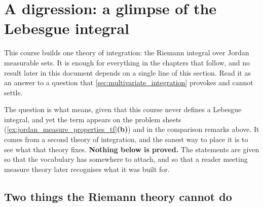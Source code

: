 
\section{A digression: a glimpse of the Lebesgue integral}
\label{sec:lebesgue_digression}

This course builds one theory of integration: the Riemann integral over Jordan measurable sets. It
is enough for everything in the chapters that follow, and no result later in this document depends
on a single line of this section. Read it as an answer to a question that
\cref{sec:multivariate_integration} provokes and cannot settle.

The question is what  means, given that this course never defines a Lebesgue
integral, and yet the term appears on the problem sheets (\cref{ex:jordan_measure_properties_tf}\textbf{(b)}) and in the
comparison remarks above. It comes from a second theory of integration, and the sanest way to place
it is to see what that theory fixes. \textbf{Nothing below is proved.} The statements are given so
that the vocabulary has somewhere to attach, and so that a reader meeting measure theory later
recognises what it was built for.

\subsection{Two things the Riemann theory cannot do}

